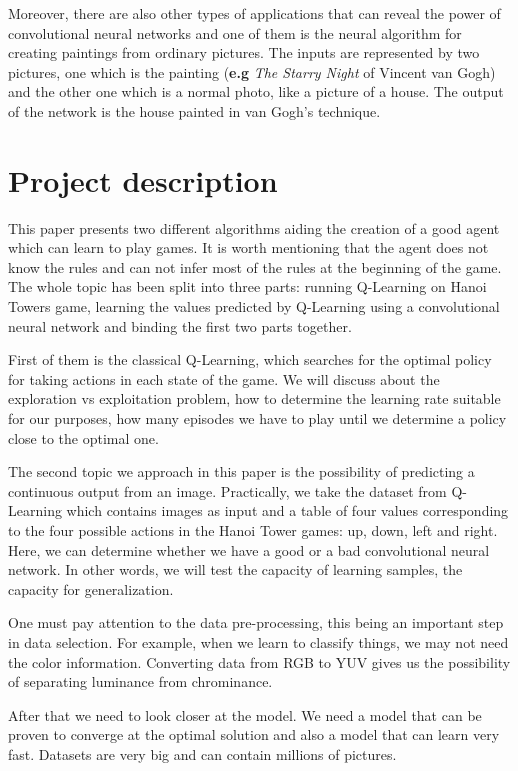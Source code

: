 Moreover, there are also other types of applications that can reveal the power of convolutional neural networks and one of them is the neural algorithm for creating paintings\cite{paintings} from ordinary pictures. The inputs are represented by two pictures, one which is the painting (\textbf{e.g} \textit{The Starry Night} of Vincent van Gogh) and the other one which is a normal photo, like a picture of a house. The output of the network is the house painted in van Gogh's technique.


\section{Project description}
\label{sec:proj-description}
This paper presents two different algorithms aiding the creation of a good agent which can learn to play games. It is worth mentioning that the agent does not know the rules and can not infer most of the rules at the beginning of the game. The whole topic has been split into three parts: running Q-Learning on Hanoi Towers game, learning the values predicted by Q-Learning using a convolutional neural network and binding the first two parts together.

First of them is the classical Q-Learning, which searches for the optimal policy for taking actions in each state of the game. We will discuss about the exploration vs exploitation problem, how to determine the learning rate suitable for our purposes, how many episodes we have to play until we determine a policy close to the optimal one.

The second topic we approach in this paper is the possibility of predicting a continuous output from an image. Practically, we take the dataset from Q-Learning which contains images as input and a table of four values corresponding to the four possible actions in the Hanoi Tower games: up, down, left and right.
Here, we can determine whether we have a good or a bad convolutional neural network. In other words, we will test the capacity of learning samples, the capacity for generalization.

One must pay attention to the data pre-processing, this being an important step in data selection. For example, when we learn to classify things, we may not need the color information. Converting data from RGB to YUV gives us the possibility of separating luminance from chrominance.

After that we need to look closer at the model. We need a model that can be proven to converge at the optimal solution and also a model that can learn very fast. Datasets are very big and can contain millions of pictures.

